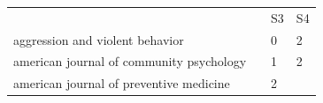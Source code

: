 \documentclass[]{tufte-handout}
\begin{document}
\begin{longtable}[]{@{}llll@{}}
\toprule
\begin{minipage}[t]{0.63\columnwidth}\raggedright\strut
\strut
\end{minipage} & \begin{minipage}[t]{0.04\columnwidth}\raggedright\strut
\strut
\end{minipage} & \begin{minipage}[t]{0.06\columnwidth}\raggedright\strut
S3\strut
\end{minipage} & \begin{minipage}[t]{0.06\columnwidth}\raggedright\strut
S4\strut
\end{minipage}\tabularnewline
\begin{minipage}[t]{0.63\columnwidth}\raggedright\strut
aggression and violent behavior\strut
\end{minipage} & \begin{minipage}[t]{0.04\columnwidth}\raggedright\strut
\strut
\end{minipage} & \begin{minipage}[t]{0.06\columnwidth}\raggedright\strut
0\strut
\end{minipage} & \begin{minipage}[t]{0.06\columnwidth}\raggedright\strut
2\strut
\end{minipage}\tabularnewline
\begin{minipage}[t]{0.63\columnwidth}\raggedright\strut
american journal of community psychology\strut
\end{minipage} & \begin{minipage}[t]{0.04\columnwidth}\raggedright\strut
\strut
\end{minipage} & \begin{minipage}[t]{0.06\columnwidth}\raggedright\strut
1\strut
\end{minipage} & \begin{minipage}[t]{0.06\columnwidth}\raggedright\strut
2\strut
\end{minipage}\tabularnewline
\begin{minipage}[t]{0.63\columnwidth}\raggedright\strut
american journal of preventive medicine\strut
\end{minipage} & \begin{minipage}[t]{0.04\columnwidth}\raggedright\strut
\strut
\end{minipage} & \begin{minipage}[t]{0.06\columnwidth}\raggedright\strut
2\strut
\end{minipage} & \begin{minipage}[t]{0.06\columnwidth}\raggedright\strut

\end{minipage}
\end{longtable}
\end{document}
